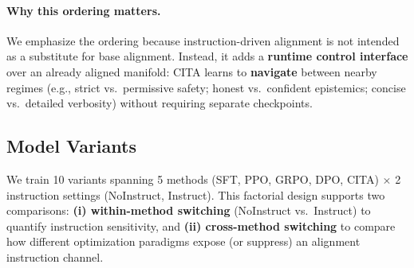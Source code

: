 \vspace{-0.2em}
\paragraph{\textbf{Why this ordering matters.}}
We emphasize the ordering because instruction-driven alignment is not intended as a substitute for base alignment.
Instead, it adds a \textbf{runtime control interface} over an already aligned manifold:
\textsc{CITA} learns to \textbf{navigate} between nearby regimes (e.g., strict vs.\ permissive safety; honest vs.\ confident epistemics; concise vs.\ detailed verbosity) without requiring separate checkpoints.

\vspace{-1mm}
\subsection{Model Variants}
\label{sec:model_variants}

We train 10 variants spanning 5 methods (SFT, PPO, GRPO, DPO, \textsc{CITA}) $\times$ 2 instruction settings (NoInstruct, Instruct).
This factorial design supports two comparisons:
\textbf{(i) within-method switching} (NoInstruct vs.\ Instruct) to quantify instruction sensitivity, and
\textbf{(ii) cross-method switching} to compare how different optimization paradigms expose (or suppress) an alignment instruction channel.

